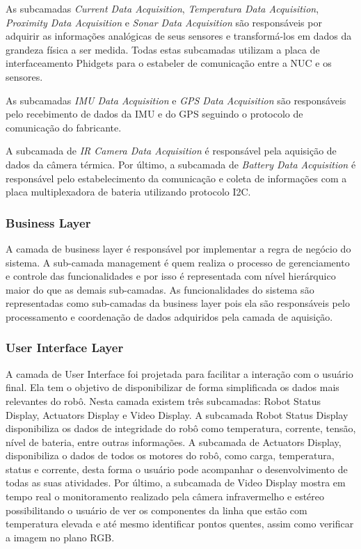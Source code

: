 As subcamadas \textit{Current Data Acquisition}, \textit{Temperatura Data Acquisition}, \textit{Proximity Data Acquisition} e \textit{Sonar Data Acquisition} são responsáveis por adquirir as informações analógicas de seus sensores e transformá-los em dados da grandeza física a ser medida. Todas estas subcamadas utilizam a placa de interfaceamento Phidgets para o estabeler de comunicação entre a NUC e os sensores.

As subcamadas \textit{IMU Data Acquisition} e \textit{GPS Data Acquisition} são responsáveis pelo recebimento de dados da IMU e do GPS seguindo o protocolo de comunicação do fabricante. 

A subcamada de \textit{IR Camera Data Acquisition} é responsável pela aquisição de dados da câmera térmica. 
Por último, a subcamada de \textit{Battery Data Acquisition} é responsável pelo estabelecimento da comunicação e coleta de informações com a placa multiplexadora de bateria utilizando protocolo I2C.

\subsubsection{Business Layer}

A camada de business layer é responsável por implementar a regra de negócio do sistema. A sub-camada management é quem realiza o processo de gerenciamento e controle das funcionalidades e por isso é representada com nível hierárquico maior do que as demais sub-camadas. As funcionalidades do sistema são representadas como sub-camadas da business layer pois ela são responsáveis pelo processamento e coordenação de dados adquiridos pela camada de aquisição. 


\subsubsection{User Interface Layer}

A camada de User Interface foi projetada para facilitar a interação com o usuário final. Ela tem o objetivo de disponibilizar de forma simplificada os dados mais relevantes do robô. Nesta camada existem três subcamadas: Robot Status Display, Actuators Display e Video Display. A subcamada Robot Status Display disponibiliza os dados de integridade do robô como temperatura, corrente, tensão, nível de bateria, entre outras informações. A subcamada de Actuators Display, disponibiliza o dados de todos os motores do robô, como carga, temperatura, status e corrente, desta forma o usuário pode acompanhar o desenvolvimento de todas as suas atividades. Por último, a subcamada de Video Display mostra em tempo real o monitoramento realizado pela câmera infravermelho e estéreo possibilitando o usuário de ver os componentes da linha que estão com temperatura elevada e até mesmo identificar pontos quentes, assim como verificar a imagem no plano RGB.

